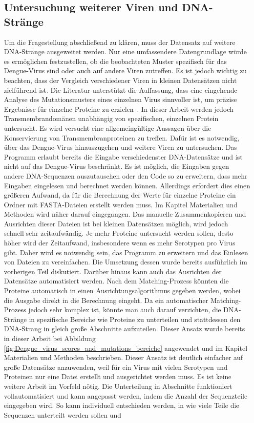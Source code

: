 \documentclass[german,version-2022-01]{uzl-thesis}
\begin{document}
\subsection{Untersuchung weiterer Viren und DNA-Str\"ange}
Um die Fragestellung abschlie\ss{}end zu kl\"aren, muss der Datensatz auf weitere DNA-Str\"ange ausgeweitet werden. Nur eine umfassendere Datengrundlage w\"urde es erm\"oglichen festzustellen, ob die beobachteten Muster spezifisch f\"ur das Dengue-Virus sind oder auch auf andere Viren zutreffen. Es ist jedoch wichtig zu beachten, dass der Vergleich verschiedener Viren in kleinen Datens\"atzen nicht zielf\"uhrend ist. Die Literatur unterst\"utzt die Auffassung, dass eine eingehende Analyse des Mutationsmusters eines einzelnen Virus sinnvoller ist, um pr\"azise Ergebnisse f\"ur einzelne Proteine zu erzielen~\cite{nina}. In dieser Arbeit werden jedoch Transmembrandom\"anen unabh\"angig von spezifischen, einzelnen Protein untersucht. Es wird versucht eine allgemeing\"ultige Aussagen \"uber die Konservierung von Transmembranproteinen zu treffen. Daf\"ur ist es notwendig, \"uber das Dengue-Virus hinauszugehen und weitere Viren zu untersuchen. Das Programm erlaubt bereits die Eingabe verschiedenster DNA-Datens\"atze und ist nicht auf das Dengue-Virus beschr\"ankt. Es ist m\"oglich, die Eingaben gegen andere DNA-Sequenzen auszutauschen oder den Code so zu erweitern, dass mehr Eingaben eingelesen und berechnet werden k\"onnen. Allerdings erfordert dies einen gr\"o\ss{}eren Aufwand, da f\"ur die Berechnung der Werte f\"ur einzelne Proteine ein Ordner mit FASTA-Dateien erstellt werden muss. Im Kapitel Materialien und Methoden wird n\"aher darauf eingegangen. Das manuelle Zusammenkopieren und Ausrichten dieser Dateien ist bei kleinen Datens\"atzen m\"oglich, wird jedoch schnell sehr zeitaufw\"andig. Je mehr Proteine untersucht werden sollen, desto h\"oher wird der Zeitaufwand, insbesondere wenn es mehr Serotypen pro Virus gibt. Daher wird es notwendig sein, das Programm zu erweitern und das Einlesen von Dateien zu vereinfachen. Die Umsetzung dessen wurde bereits ausf\"uhrlich im vorherigen Teil diskutiert. Dar\"uber hinaus kann auch das Ausrichten der Datens\"atze automatisiert werden. Nach dem Matching-Prozess k\"onnten die Proteine automatisch in einen Ausrichtungsalgorithmus gegeben werden, wobei die Ausgabe direkt in die Berechnung eingeht. Da ein automatischer Matching-Prozess jedoch sehr komplex ist, k\"onnte man auch darauf verzichten, die DNA-Str\"ange in spezifische Bereiche wie Proteine zu unterteilen und stattdessen den DNA-Strang in gleich gro\ss{}e Abschnitte aufzuteilen. Dieser Ansatz wurde bereits in dieser Arbeit bei Abbildung \ref{fig:Dengue_virus_scores_and_mutations_bereiche} angewendet und im Kapitel Materialien und Methoden beschrieben. Dieser Ansatz ist deutlich einfacher auf gro\ss{}e Datens\"atze anzuwenden, weil f\"ur ein Virus mit vielen Serotypen und Proteinen nur eine Datei erstellt und ausgerichtet werden muss. Es ist keine weitere Arbeit im Vorfeld n\"otig. Die Unterteilung in Abschnitte funktioniert vollautomatisiert und kann angepasst werden, indem die Anzahl der Sequenzteile eingegeben wird. So kann individuell entschieden werden, in wie viele Teile die Sequenzen unterteilt werden sollen und 
\end{document}
